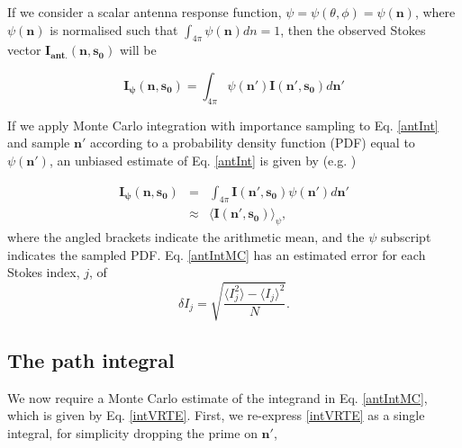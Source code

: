 If we consider a scalar antenna response function,
$\psi=\psi(\theta,\phi)=\psi(\mathbf{n})$, where $\psi(\mathbf{n})$ is
normalised such that $\int_{4\pi}\psi(\mathbf{n})dn=1$, then the
observed Stokes vector $\mathbf{I_{ant.}(n,s_0)}$ will be

\begin{equation}
\mathbf{I_\psi(n,s_0)}=\int_{4\pi}\psi(\mathbf{n'})\mathbf{I(n',s_0)}d\mathbf{n'}
\label{antInt}
\end{equation}

If we apply Monte Carlo integration with importance sampling to
Eq. \ref{antInt} and sample $\mathbf{n'}$ according to a probability
density function (PDF) equal to $\psi(\mathbf{n'})$, an unbiased
estimate of Eq. \ref{antInt} is given by (e.g. \cite{press:92})

\begin{eqnarray}
\mathbf{I_\psi(n,s_0)}&=&\int_{4\pi}\mathbf{I(n',s_0)}\psi(\mathbf{n'})d\mathbf{n'}\\
&\approx&\langle \mathbf{I(n',s_0)} \rangle_\psi,
\label{antIntMC}
\end{eqnarray}
where the angled brackets indicate the arithmetic mean, and the $\psi$ subscript
indicates the sampled PDF.  Eq. \ref{antIntMC} has an estimated error for each
Stokes index, $j$,  of
\begin{equation}
\delta I_j=\sqrt{\frac{\langle I_j^2\rangle-\langle I_j\rangle^2}{N}}.
\label{error}
\end{equation}

\subsection{The path integral}
\label{sec:path_integral}
We now require a Monte Carlo estimate of the integrand in
Eq. \ref{antIntMC}, which is given by Eq. \ref{intVRTE}.  First, we
re-express \ref{intVRTE} as a single integral, for simplicity dropping
the prime on $\mathbf{n'}$,

